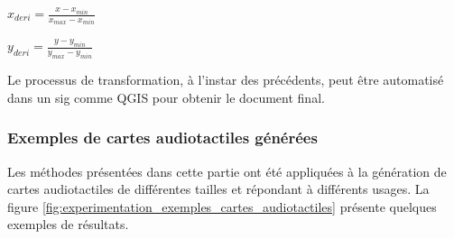\newpar{}

$x_{deri} = \frac{x - x_{min}}{x_{max} - x_{min}}$

$y_{deri} = \frac{y - y_{min}}{y_{max} - y_{min}}$

\newpar{}

Le processus de transformation, à l'instar des précédents, peut être automatisé dans un \gls{sig} comme QGIS pour obtenir le document final.

\subsubsection{Exemples de cartes audiotactiles générées}

Les méthodes présentées dans cette partie ont été appliquées à la génération de cartes audiotactiles de différentes tailles et répondant à différents usages. La figure \ref{fig:experimentation_exemples_cartes_audiotactiles} présente quelques exemples de résultats.

